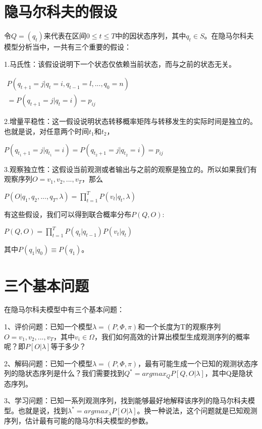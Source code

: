 \documentclass[UTF8]{ctexart}
\begin{document}
\section{隐马尔科夫的假设}

令$Q=(q_t)$来代表在区间$0\le t\le T$中的因状态序列，其中$q_t\in S$。在隐马尔科夫模型分析当中，一共有三个重要的假设：

1.马氏性：该假设说明下一个状态仅依赖当前状态，而与之前的状态无关。
\begin{center}
$\begin{aligned}
P(q_{t+1}=j|q_t=i,q_{t-1}=l,...,q_0=n) \\
=P(q_{t+1}=j|q_t=i)=p_{ij}
\end{aligned}
$
\end{center}
2.增量平稳性：这一假设说明状态转移概率矩阵与转移发生的实际时间是独立的。也就是说，对任意两个时间$t_1$和$t_2$，

$P(q_{t_1+1}=j|q_{t_1}=i)=P(q_{t_2+1}=j|q_{t_2}=i)=p_{ij}$

3.观察独立性：这假设当前观测或者输出与之前的观察是独立的。所以如果我们有观察序列$O=v_1,v_2,...,v_T$，那么

$P(O|q_1,q_2,...,q_T,\lambda) = \prod_{t=1}^T P(v_t|q_t,\lambda)$

有这些假设，我们可以得到联合概率分布$P(Q,O)$:

\begin{center}
$P(Q,O)=\prod_{t=1}^T P(q_t|q_{t-1})P(v_t|q_t)$
\end{center}

其中$P(q_1|q_0)\equiv P(q_1)$。


\section{三个基本问题}

在隐马尔科夫模型中有三个基本问题：

1、评价问题：已知一个模型$\lambda=(P,\Phi,\pi)$和一个长度为T的观察序列$O=v_1,v_2,...,v_T$，其中$v_i\in \Omega$，我们如何高效的计算出模型生成观测序列的概率呢？即$P[O|\lambda]$等于多少？

2、解码问题：已知一个模型$\lambda=(P,\Phi,\pi)$，最有可能生成一个已知的观测状态序列的隐状态序列是什么？我们需要找到$Q^*=arg max_QP[Q,O|\lambda]$，其中Q是隐状态序列。

3、学习问题：已知一系列观测序列，找到能够最好地解释该序列的隐马尔科夫模型。也就是说，找到$\lambda^*=arg max_\lambda P[O|\lambda]$。换一种说法，这个问题就是已知观测序列，估计最有可能的隐马尔科夫模型的参数。
\end{document}
